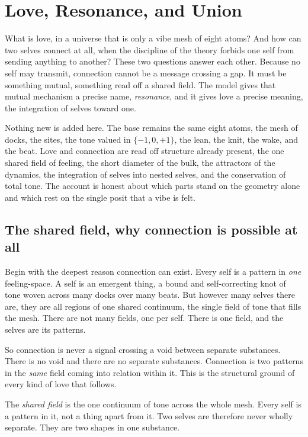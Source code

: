\section{Love, Resonance, and Union}

What is love, in a universe that is only a vibe mesh of eight atoms? And how can two selves connect at all, when the discipline of the theory forbids one self from sending anything to another? These two questions answer each other. Because no self may transmit, connection cannot be a message crossing a gap. It must be something mutual, something read off a shared field. The model gives that mutual mechanism a precise name, \emph{resonance}, and it gives love a precise meaning, the integration of selves toward one.

Nothing new is added here. The base remains the same eight atoms, the mesh of docks, the sites, the tone valued in $\{-1,0,+1\}$, the lean, the knit, the wake, and the beat. Love and connection are read off structure already present, the one shared field of feeling, the short diameter of the bulk, the attractors of the dynamics, the integration of selves into nested selves, and the conservation of total tone. The account is honest about which parts stand on the geometry alone and which rest on the single posit that a vibe is felt.

\subsection{The shared field, why connection is possible at all}

Begin with the deepest reason connection can exist. Every self is a pattern in \emph{one} feeling-space. A self is an emergent thing, a bound and self-correcting knot of tone woven across many docks over many beats. But however many selves there are, they are all regions of one shared continuum, the single field of tone that fills the mesh. There are not many fields, one per self. There is one field, and the selves are its patterns.

So connection is never a signal crossing a void between separate substances. There is no void and there are no separate substances. Connection is two patterns in the \emph{same} field coming into relation within it. This is the structural ground of every kind of love that follows.

\begin{definition}
The \emph{shared field} is the one continuum of tone across the whole mesh. Every self is a pattern in it, not a thing apart from it. Two selves are therefore never wholly separate. They are two shapes in one substance.
\end{definition}

